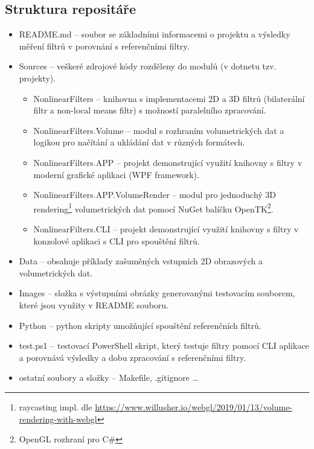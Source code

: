 \subsection*{Struktura repositáře}
\begin{itemize}
    \item README.md -- soubor se základními informacemi o projektu a výsledky měření filtrů v porovnání s referenčními filtry. 
    \item Sources -- veškeré zdrojové kódy rozděleny do modulů (v dotnetu tzv. projekty).
    \begin{itemize}
        \item NonlinearFilters -- knihovna s implementacemi 2D a 3D filtrů (bilaterální filtr a non-local means filtr) s možností paralelního zpracování.
        \item NonlinearFilters.Volume -- modul s rozhraním volumetrických dat a logikou pro načítání a ukládání dat v různých formátech.
        \item NonlinearFilters.APP -- projekt demonstrující využití knihovny s filtry v moderní grafické aplikaci (WPF framework).
        \item NonlinearFilters.APP.VolumeRender -- modul pro jednoduchý 3D rendering\footnote{raycasting impl. dle \url{https://www.willusher.io/webgl/2019/01/13/volume-rendering-with-webgl}} volumetrických dat pomocí NuGet balíčku OpenTK\footnote{OpenGL rozhraní pro C\#}.
        \item NonlinearFilters.CLI -- projekt demonstrující využití knihovny s filtry v konzolové aplikaci s CLI pro spouštění filtrů.
    \end{itemize}
    \item Data -- obsahuje příklady zašuměných vstupních 2D obrazových a volumetrických dat.
    \item Images -- složka s výstupními obrázky generovanými testovacím souborem, které jsou využity v README souboru.
    \item Python -- python skripty umožňující spouštění referenčních filtrů.
    \item test.ps1 -- testovací PowerShell skript, který testuje filtry pomocí CLI aplikace a porovnává výsledky a dobu zpracování s referenčními filtry. 
    \item ostatní soubory a složky -- Makefile, .gitignore \dots
\end{itemize}

